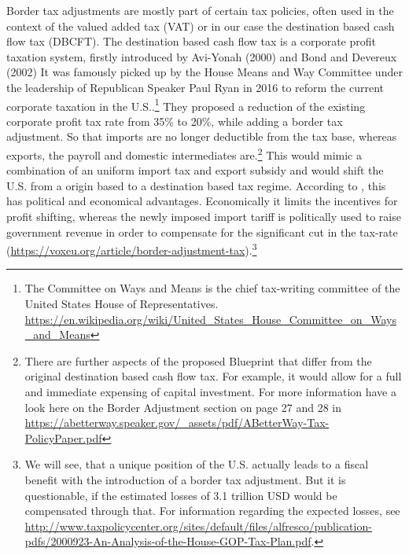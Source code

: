 Border tax adjustments are mostly part of certain tax policies, often used in the context of the valued added tax (VAT) or in our case the destination based cash flow tax (DBCFT). The destination based cash flow tax is a corporate profit taxation system, firstly introduced by Avi-Yonah (2000) and Bond and Devereux (2002)
It was famously picked up by the House Means and Way Committee under the leadership of Republican Speaker Paul Ryan in 2016 to reform the current corporate taxation in the U.S..\footnote{The Committee on Ways and Means is the chief tax-writing committee of the United States House of Representatives. \url{https://en.wikipedia.org/wiki/United_States_House_Committee_on_Ways_and_Means}} They proposed a reduction of the existing corporate profit tax rate from 35\% to 20\%, while adding a border tax adjustment. So that imports are no longer deductible from the tax base, whereas exports, the payroll and domestic intermediates are.\footnote{There are further aspects of the proposed Blueprint that differ from the original destination based cash flow tax. For example, it would allow for a full and immediate expensing of capital investment. For more information have a look here on the Border Adjustment section on page 27 and 28 in \url{https://abetterway.speaker.gov/_assets/pdf/ABetterWay-Tax-PolicyPaper.pdf}} This would mimic a combination of an uniform import tax and export subsidy and would shift the U.S. from a origin based to a destination based tax regime. According to \cite{auerbach2017destination}, this has political and economical advantages. Economically it limits the incentives for profit shifting, whereas the newly imposed import tariff is politically used to raise government revenue in order to compensate for the significant cut in the tax-rate (\url{https://voxeu.org/article/border-adjustment-tax}).\footnote{We will see, that a unique position of the U.S. actually leads to a fiscal benefit with the introduction of a border tax adjustment. But it is questionable, if the estimated losses of 3.1 trillion USD would be compensated through that. For information regarding the expected losses, see \url{http://www.taxpolicycenter.org/sites/default/files/alfresco/publication-pdfs/2000923-An-Analysis-of-the-House-GOP-Tax-Plan.pdf}.} 



